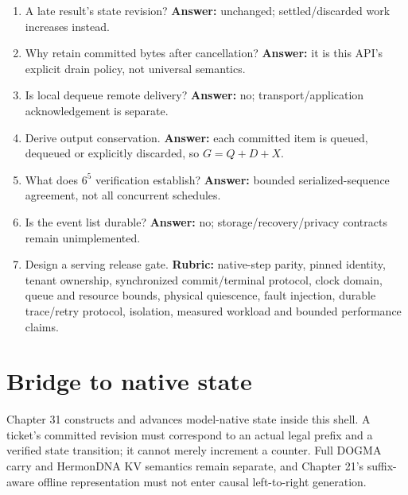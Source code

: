 \begin{enumerate}
\item A late result's state revision? \textbf{Answer:} unchanged; settled/discarded work increases instead.
\item Why retain committed bytes after cancellation? \textbf{Answer:} it is this API's explicit drain policy, not universal semantics.
\item Is local dequeue remote delivery? \textbf{Answer:} no; transport/application acknowledgement is separate.
\item Derive output conservation. \textbf{Answer:} each committed item is queued, dequeued or explicitly discarded, so $G=Q+D+X$.
\item What does $6^5$ verification establish? \textbf{Answer:} bounded serialized-sequence agreement, not all concurrent schedules.
\item Is the event list durable? \textbf{Answer:} no; storage/recovery/privacy contracts remain unimplemented.
\item Design a serving release gate. \textbf{Rubric:} native-step parity, pinned identity,
tenant ownership, synchronized commit/terminal protocol, clock domain, queue and
resource bounds, physical quiescence, fault injection, durable trace/retry protocol,
isolation, measured workload and bounded performance claims.
\end{enumerate}

\section{Bridge to native state}
Chapter 31 constructs and advances model-native state inside this shell.
A ticket's committed revision must correspond to an actual legal prefix and a
verified state transition; it cannot merely increment a counter. Full DOGMA carry
and HermonDNA KV semantics remain separate, and Chapter 21's suffix-aware offline
representation must not enter causal left-to-right generation.
